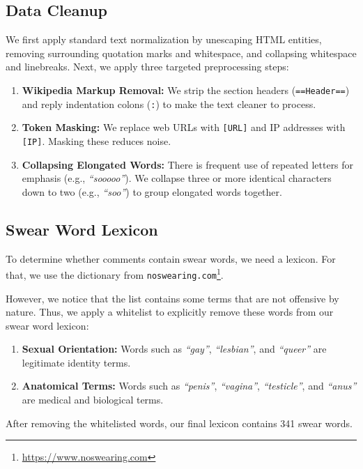 \documentclass[11pt]{article}
\begin{document}
\subsection{Data Cleanup}

We first apply standard text normalization by unescaping HTML
entities, removing surrounding quotation marks and whitespace, and
collapsing whitespace and linebreaks. Next, we apply three targeted
preprocessing steps:
\begin{enumerate}
  \item \textbf{Wikipedia Markup Removal:} We strip the section
    headers (\texttt{==Header==}) and reply indentation colons
    (\texttt{:}) to make the text cleaner to process.
  \item \textbf{Token Masking:} We replace web URLs with
    \texttt{[URL]} and IP addresses with \texttt{[IP]}. Masking these
    reduces noise.
  \item \textbf{Collapsing Elongated Words:} There is frequent use of
    repeated letters for emphasis (e.g., \textit{``sooooo''}). We
    collapse three or more identical characters down to two (e.g.,
    \textit{``soo''}) to group elongated words together.
\end{enumerate}

\subsection{Swear Word Lexicon}

To determine whether comments contain swear words, we need a lexicon.
For that, we use the dictionary from
\texttt{noswearing.com}\footnote{\url{https://www.noswearing.com}}.

However, we notice that the list contains some terms that are not
offensive by nature. Thus, we apply a whitelist to explicitly remove
these words from our swear word lexicon:

\begin{enumerate}
  \item \textbf{Sexual Orientation:} Words such as \textit{``gay''},
    \textit{``lesbian''}, and \textit{``queer''} are legitimate identity terms.
  \item \textbf{Anatomical Terms:} Words such as \textit{``penis''},
    \textit{``vagina''}, \textit{``testicle''}, and \textit{``anus''}
    are medical and
    biological terms.
\end{enumerate}

After removing the whitelisted words, our final lexicon contains 341
swear words.
\end{document}
